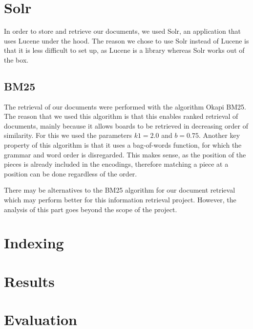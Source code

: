 \documentclass[11pt]{article}
\begin{document}
    \section{Solr}

    In order to store and retrieve our documents, we used Solr, an application that uses Lucene under the hood. The reason we chose to use Solr instead of Lucene is that it is less difficult to set up, as Lucene is a library whereas Solr works out of the box.

    \subsection{BM25}

    The retrieval of our documents were performed with the algorithm Okapi BM25. The reason that we used this algorithm is that this enables ranked retrieval of documents, mainly because it allows boards to be retrieved in decreasing order of similarity. For this we used the parameters $k1 = 2.0$ and $b = 0.75$. Another key property of this algorithm is that it uses a bag-of-words function, for which the grammar and word order is disregarded. This makes sense, as the position of the pieces is already included in the encodings, therefore matching a piece at a position can be done regardless of the order.


    There may be alternatives to the BM25 algorithm for our document retrieval which may perform better for this information retrieval project. However, the analysis of this part goes beyond the scope of the project.




    \section{Indexing}


    \section{Results}


    \section{Evaluation}
\end{document}
